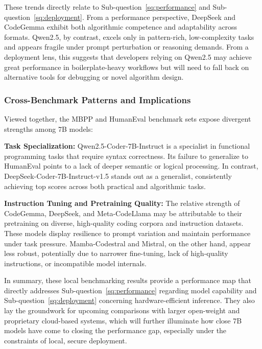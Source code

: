 These trends directly relate to Sub-question~\ref{sq:performance} and Sub-question~\ref{sq:deployment}. From a performance perspective, DeepSeek and CodeGemma exhibit both algorithmic competence and adaptability across formats. Qwen2.5, by contrast, excels only in pattern-rich, low-complexity tasks and appears fragile under prompt perturbation or reasoning demands. From a deployment lens, this suggests that developers relying on Qwen2.5 may achieve great performance in boilerplate-heavy workflows but will need to fall back on alternative tools for debugging or novel algorithm design.

\subsubsection*{Cross-Benchmark Patterns and Implications}

Viewed together, the \gls{MBPP} and HumanEval benchmark sets expose divergent strengths among 7B models:

\textbf{Task Specialization:} Qwen2.5-Coder-7B-Instruct is a specialist in functional programming tasks that require syntax correctness. Its failure to generalize to HumanEval points to a lack of deeper semantic or logical processing. In contrast, DeepSeek-Coder-7B-Instruct-v1.5 stands out as a generalist, consistently achieving top scores across both practical and algorithmic tasks.

\textbf{Instruction Tuning and Pretraining Quality:} The relative strength of CodeGemma, DeepSeek, and Meta-CodeLlama may be attributable to their pretraining on diverse, high-quality coding corpora and instruction datasets. These models display resilience to prompt variation and maintain performance under task pressure. Mamba-Codestral and Mistral, on the other hand, appear less robust, potentially due to narrower fine-tuning, lack of high-quality instructions, or incompatible model internals.

In summary, these local benchmarking results provide a performance map that directly addresses Sub-question~\ref{sq:performance} regarding model capability and Sub-question~\ref{sq:deployment} concerning hardware-efficient inference. They also lay the groundwork for upcoming comparisons with larger open-weight and proprietary cloud-based systems, which will further illuminate how close 7B models have come to closing the performance gap, especially under the constraints of local, secure deployment.



